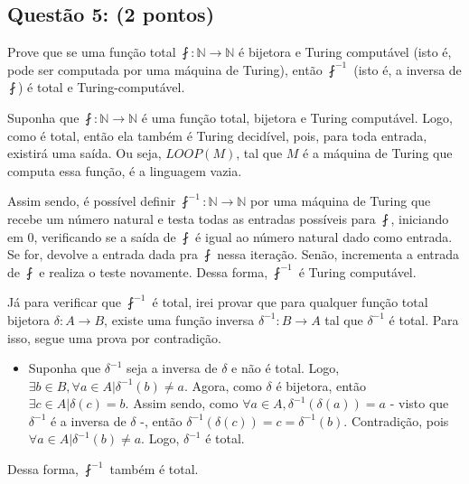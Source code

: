 \documentclass{article}
\begin{document}
\subsection*{Questão 5: (2 pontos)} Prove que se uma função total $\fint : \mathds{N} \to \mathds{N}$ é bijetora e Turing computável (isto é, pode ser computada por uma máquina de Turing), então $\fint^{-1}$ (isto é, a inversa de $\fint$) é total e Turing-computável.

{
\color{blue}
  \par Suponha que $\fint : \mathds{N} \to \mathds{N}$ é uma função total, bijetora e Turing computável. Logo, como é total, então ela também é Turing decidível, pois, para toda entrada, existirá uma saída. Ou seja, $LOOP(M)$, tal que $M$ é a máquina de Turing que computa essa função, é a linguagem vazia.
  \par Assim sendo, é possível definir $\fint^{-1} : \mathds{N} \to \mathds{N}$ por uma máquina de Turing que recebe um número natural e testa todas as entradas possíveis para $\fint$, iniciando em 0, verificando se a saída de $\fint$ é igual ao número natural dado como entrada. Se for, devolve a entrada dada pra $\fint$ nessa iteração. Senão, incrementa a entrada de $\fint$ e realiza o teste novamente. Dessa forma, $\fint^{-1}$ é Turing computável.
  \par Já para verificar que $\fint^{-1}$ é total, irei provar que para qualquer função total bijetora $\delta: A \to B$, existe uma função inversa $\delta^{-1}: B \to A$ tal que $\delta^{-1}$ é total. Para isso, segue uma prova por contradição.
  \begin{itemize}
    \item Suponha que $\delta^{-1}$ seja a inversa de $\delta$ e não é total. Logo, $\exists b \in B, \forall a \in A | \delta^{-1}(b) \neq a$. Agora, como $\delta$ é bijetora, então $\exists c \in A | \delta(c) = b$. Assim sendo, como $\forall a \in A, \delta^{-1}(\delta(a))=a$ - visto que $\delta^{-1}$ é a inversa de $\delta$ -, então $\delta^{-1}(\delta(c))=c=\delta^{-1}(b)$. Contradição, pois $\forall a \in A | \delta^{-1}(b) \neq a$. Logo, $\delta^{-1}$ é total.
  \end{itemize}
  Dessa forma, $\fint^{-1}$ também é total.
}
\end{document}
